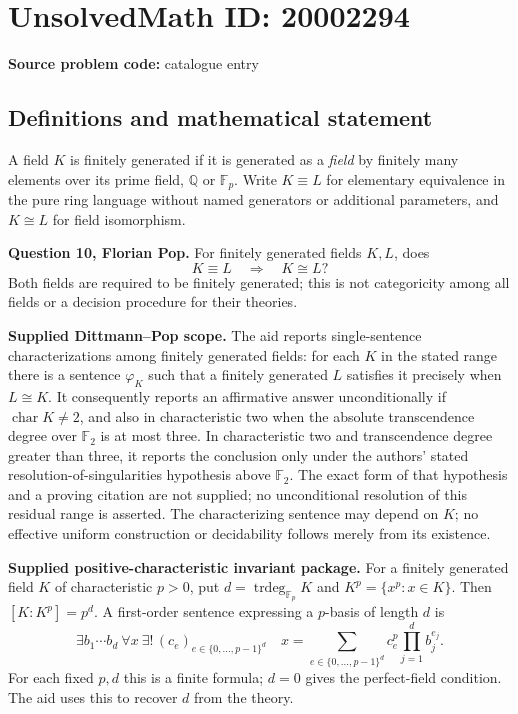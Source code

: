 \documentclass[11pt]{article}
\newcommand{\Q}{\mathbb{Q}}
\newcommand{\F}{\mathbb{F}}
\begin{document}
\section*{UnsolvedMath ID: 20002294}
\textbf{Source problem code:} catalogue entry
\subsection{Definitions and mathematical statement}
A field $K$ is finitely generated if it is generated as a \emph{field} by finitely many elements over its prime field, $\Q$ or $\F_p$. Write $K\equiv L$ for elementary equivalence in the pure ring language without named generators or additional parameters, and $K\cong L$ for field isomorphism.

\textbf{Question 10, Florian Pop.} For finitely generated fields $K,L$, does
\[
 K\equiv L\quad\Longrightarrow\quad K\cong L?
\]
Both fields are required to be finitely generated; this is not categoricity among all fields or a decision procedure for their theories.

\textbf{Supplied Dittmann--Pop scope.} The aid reports single-sentence characterizations among finitely generated fields: for each $K$ in the stated range there is a sentence $\varphi_K$ such that a finitely generated $L$ satisfies it precisely when $L\cong K$. It consequently reports an affirmative answer unconditionally if $\operatorname{char}K\ne2$, and also in characteristic two when the absolute transcendence degree over $\F_2$ is at most three. In characteristic two and transcendence degree greater than three, it reports the conclusion only under the authors' stated resolution-of-singularities hypothesis above $\F_2$. The exact form of that hypothesis and a proving citation are not supplied; no unconditional resolution of this residual range is asserted. The characterizing sentence may depend on $K$; no effective uniform construction or decidability follows merely from its existence.

\textbf{Supplied positive-characteristic invariant package.} For a finitely generated field $K$ of characteristic $p>0$, put $d=\operatorname{trdeg}_{\F_p}K$ and $K^p=\{x^p:x\in K\}$. Then $[K:K^p]=p^d$. A first-order sentence expressing a $p$-basis of length $d$ is
\[
 \exists b_1\cdots b_d\ \forall x\ \exists!\,(c_e)_{e\in\{0,\ldots,p-1\}^d}
 \quad x=\sum_{e\in\{0,\ldots,p-1\}^d}
                       c_e^p\prod_{j=1}^db_j^{e_j}.
\]
For each fixed $p,d$ this is a finite formula; $d=0$ gives the perfect-field condition. The aid uses this to recover $d$ from the theory.
\end{document}
